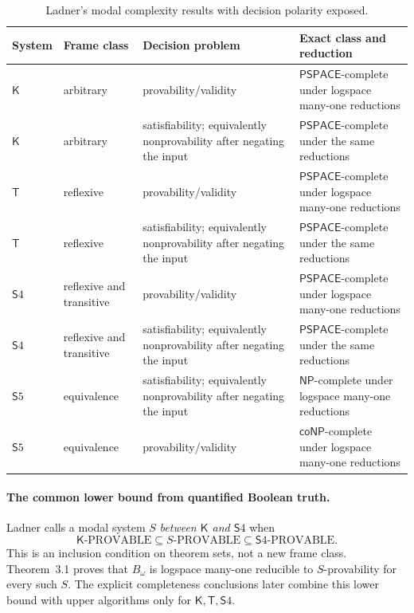 \begin{table}[htbp]
\centering\scriptsize
\begin{tabularx}{\textwidth}{@{}l l X X@{}}
\toprule
System & Frame class & Decision problem & Exact class and reduction \\
\midrule
\(\mathsf K\) & arbitrary & provability/validity &
\(\mathsf{PSPACE}\)-complete under logspace many-one reductions \\
\(\mathsf K\) & arbitrary & satisfiability; equivalently nonprovability after
negating the input & \(\mathsf{PSPACE}\)-complete under the same reductions \\
\(\mathsf T\) & reflexive & provability/validity &
\(\mathsf{PSPACE}\)-complete under logspace many-one reductions \\
\(\mathsf T\) & reflexive & satisfiability; equivalently nonprovability after
negating the input & \(\mathsf{PSPACE}\)-complete under the same reductions \\
\(\mathsf S4\) & reflexive and transitive & provability/validity &
\(\mathsf{PSPACE}\)-complete under logspace many-one reductions \\
\(\mathsf S4\) & reflexive and transitive & satisfiability; equivalently
nonprovability after negating the input & \(\mathsf{PSPACE}\)-complete under
the same reductions \\
\(\mathsf S5\) & equivalence & satisfiability; equivalently nonprovability
after negating the input & \(\mathsf{NP}\)-complete under logspace many-one
reductions \\
\(\mathsf S5\) & equivalence & provability/validity &
\(\mathsf{coNP}\)-complete under logspace many-one reductions \\
\bottomrule
\end{tabularx}
\caption{Ladner's modal complexity results with decision polarity exposed.}
\label{tab:p09-ladner-polarity}
\end{table}

\paragraph{The common lower bound from quantified Boolean truth.}
Ladner calls a modal system \(S\) \emph{between \(\mathsf K\) and
\(\mathsf S4\)} when
\[
 \mathsf K\text{-PROVABLE}
 \subseteq S\text{-PROVABLE}
 \subseteq \mathsf S4\text{-PROVABLE}.
\]
This is an inclusion condition on theorem sets, not a new frame class.
Theorem~3.1 proves that \(B_\omega\) is logspace many-one reducible to
\(S\)-provability for every such \(S\).  The explicit completeness conclusions
later combine this lower bound with upper algorithms only for
\(\mathsf K,\mathsf T,\mathsf S4\).

